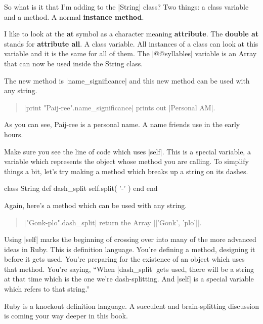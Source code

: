 \documentclass[12pt,twoside]{report}
\begin{document}
So what is it that I'm adding to the
\rubyinline|String| class?  Two things: a class
variable and a method.  A normal {\bf instance method}.

I like to look at the {\bf at} symbol as a character meaning {\bf
  attribute}.  The {\bf double at} stands for {\bf attribute all}.  A
class variable.  All instances of a class can look at this variable
and it is the same for all of them.  The
\rubyinline|@@syllables| variable is an Array that can
now be used inside the String class.

The new method is \rubyinline|name_significance| and
this new method can be used with any string.

\begin{quote}
\rubyinline|print "Paij-ree".name_significance| prints
out \rubyinline|Personal AM|.\end{quote}


As you can see, Paij-ree is a personal name.  A name friends use in
the early hours.

Make sure you see the line of code which uses
\rubyinline|self|.  This is a special variable, a
variable which represents the object whose method you are calling.  To
simplify things a bit, let's try making a method which breaks up a
string on its dashes.


\begin{rubycode}

 class String
   def dash_split
     self.split( '-' )
   end
 end

\end{rubycode}


Again, here's a method which can be used with any string.

\begin{quote}
\rubyinline|"Gonk-plo".dash_split| return the Array
\rubyinline|['Gonk', 'plo']|.\end{quote}


Using \rubyinline|self| marks the beginning of
crossing over into many of the more advanced ideas in Ruby. This is
definition language.  You're defining a method, designing it before it
gets used.  You're preparing for the existence of an object which uses
that method.  You're saying, ``When
\rubyinline|dash_split| gets used, there will be a
string at that time which is the one we're dash-splitting.  And
\rubyinline|self| is a special variable which refers
to that string.''

Ruby is a knockout definition language.  A succulent and
brain-splitting discussion is coming your way deeper in this book.
\end{document}
